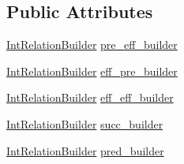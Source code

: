 \subsection*{Public Attributes}
\begin{DoxyCompactItemize}
\item 
\hyperlink{classIntRelationBuilder}{Int\-Relation\-Builder} \hyperlink{structCausalGraphBuilder_a87a37c506c86e0e1332638066ac516e9}{pre\-\_\-eff\-\_\-builder}
\item 
\hyperlink{classIntRelationBuilder}{Int\-Relation\-Builder} \hyperlink{structCausalGraphBuilder_a773e4b6bc40fc74653a9d695f9983892}{eff\-\_\-pre\-\_\-builder}
\item 
\hyperlink{classIntRelationBuilder}{Int\-Relation\-Builder} \hyperlink{structCausalGraphBuilder_a3320af04c6485bdbf93345cf2e9cfeb1}{eff\-\_\-eff\-\_\-builder}
\item 
\hyperlink{classIntRelationBuilder}{Int\-Relation\-Builder} \hyperlink{structCausalGraphBuilder_a9a722f3782f6737608fd4b5fc8d9ea4e}{succ\-\_\-builder}
\item 
\hyperlink{classIntRelationBuilder}{Int\-Relation\-Builder} \hyperlink{structCausalGraphBuilder_a916b1495bcd680ca74c216e49187fede}{pred\-\_\-builder}
\end{DoxyCompactItemize}


